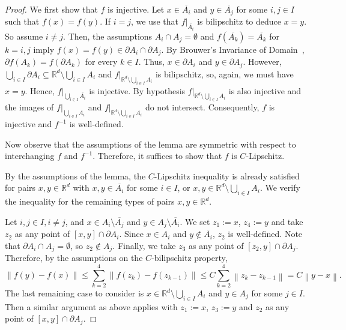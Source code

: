 \documentclass[a4paper, bibliography=totoc]{scrartcl}
\numberwithin{claimcounter}{define}
\newcommand{\R}{\mathbb{R}}
\newcommand{\enorm}[1]{\left\|#1\right\|}
\newcommand{\cl}[1]{\overline{#1}}
\begin{document}
\restatesimpleglue
\begin{proof}
	We first show that $f$ is injective. Let $x\in\cl{A_i}$ and $y\in\cl{A_j}$ for some $i,j\in I$ such that $f(x)=f(y)$. If $i=j$, we use that $f|_{\cl{A_{i}}}$ is bilipschitz to deduce $x=y$. So assume $i\neq j$. Then, the assumptions $A_{i}\cap A_{j}=\emptyset$ and $f(\cl{A_{k}})=\cl{A_{k}}$ for $k=i,j$ imply $f(x)=f(y)\in \partial A_{i}\cap \partial A_{j}$. By Brouwer's Invariance of Domain~\cite[Thm~2B.3]{Hatcher02}, $\partial f(A_k)=f(\partial A_k)$ for every $k\in I$. Thus, $x\in\partial A_i$ and $y\in\partial A_j$. However, $\bigcup_{i\in I}\partial A_{i}\subseteq \R^{d}\setminus \bigcup_{i\in I}A_{i}$ and $f|_{\R^{d}\setminus \bigcup_{i\in I}A_{i}}$ is bilipschitz, so, again, we must have $x=y$. Hence, $f|_{\bigcup_{i\in I}\cl{A_{i}}}$ is injective. By hypothesis $f|_{\R^{d}\setminus \bigcup_{i\in I}A_{i}}$ is also injective and the images of $f|_{\bigcup_{i\in I}A_{i}}$ and $f|_{\R^{d}\setminus \bigcup_{i\in I}A_{i}}$ do not intersect.
	Consequently, $f$ is injective and $f^{-1}$ is well-defined.
	
	Now observe that the assumptions of the lemma are symmetric with respect to interchanging $f$ and $f^{-1}$. Therefore, it suffices to show that $f$ is $C$-Lipschitz.
	
	By the assumptions of the lemma, the $C$-Lipschitz inequality is already satisfied for pairs $x,y\in\R^{d}$ with $x,y\in\cl{A_{i}}$ for some $i\in I$, or $x,y\in\R^{d}\setminus \bigcup_{i\in I}A_{i}$. We verify the inequality for the remaining types of pairs $x,y\in\R^{d}$. 
	
	Let $i,j\in I, i\neq j$, and $x\in A_i\setminus\cl{A_j}$ and $y\in A_j\setminus\cl{A_i}$. We set $z_1:=x$, $z_4:=y$ and take $z_2$ as any point of $[x,y]\cap\partial A_i$. Since $x\in A_i$ and $y\notin\cl{A_i}$, $z_2$ is well-defined. Note that $\partial A_{i}\cap A_{j}=\emptyset$, so $z_{2}\notin A_{j}$. Finally, we take $z_3$ as any point of $[z_2, y]\cap\partial A_j$.
	Therefore, by the assumptions on the $C$-bilipschitz property,
	\begin{equation*}
	\enorm{f(y)-f(x)}\leq \sum_{k=2}^{4}\enorm{f(z_{k})-f(z_{k-1})}\leq C\sum_{k=2}^{4}\enorm{z_{k}-z_{k-1}}=C\enorm{y-x}.
	\end{equation*}
	The last remaining case to consider is $x\in\R^{d}\setminus \bigcup_{i\in I}A_{i}$ and $y\in A_{j}$ for some $j\in I$. Then a similar argument as above applies with $z_{1}:=x$, $z_{3}:=y$ and $z_{2}$ as any point of $[x,y]\cap\partial A_{j}$.
\end{proof}
\end{document}
